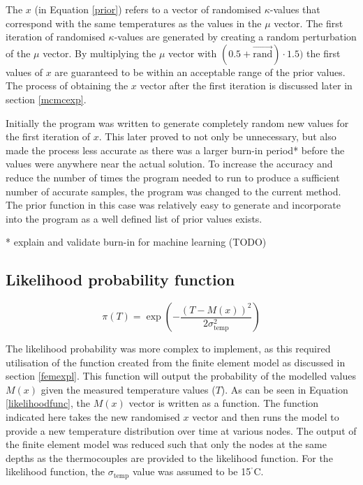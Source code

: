 The $x$ (in Equation \ref{prior}) refers to a vector of randomised $\kappa$-values that correspond with the same temperatures as the values in the $\mu$ vector.
The first iteration of randomised $\kappa$-values are generated by creating a random perturbation of the $\mu$ vector.
By multiplying the $\mu$ vector with $(0.5+\vec{\text{rand}})\cdot1.5)$ the first values of $x$ are guaranteed to be within an acceptable range of the prior values.
The process of obtaining the $x$ vector after the first iteration is discussed later in section \ref{mcmcexp}.


Initially the program was written to generate completely random new values for the first iteration of $x$. 
This later proved to not only be unnecessary, but also made the process less accurate as there was a larger burn-in period* before the values were anywhere near the actual solution.
To increase the accuracy and reduce the number of times the program needed to run to produce a sufficient number of accurate samples, the program was changed to the current method.
The prior function in this case was relatively easy to generate and incorporate into the program as a well defined list of prior values exists.

* explain and validate burn-in for machine learning (TODO)
	\subsection{Likelihood probability function}
		\begin{equation}
		\label{likelihoodfunc}
		\pi(T) = \exp\left(-\frac{\left(T-M(x)\right)^2}{2\sigma_{\text{temp}}^2}\right)
		\end{equation}
		
		The likelihood probability was more complex to implement, as this required utilisation of the function created from the finite element model as discussed in section \ref{femexpl}.
		This function will output the probability of the modelled values $M(x)$ given the measured temperature values ($T$).
		As can be seen in Equation \ref{likelihoodfunc}, the $M(x)$ vector is written as a function.
		The function indicated here takes the new randomised $x$ vector and then runs the model to provide a new temperature distribution over time at various nodes.
		The output of the finite element model was reduced such that only the nodes at the same depths as the thermocouples are provided to the likelihood function.
		For the likelihood function, the $\sigma_{\text{temp}}$ value was assumed to be 15$^{^\circ}$C.
		 

